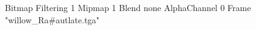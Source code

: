 {Bitmap
	{Filtering 1}
	{Mipmap 1}
	{Blend none}
	{AlphaChannel 0}
	{Frame "willow_Ra#autlate.tga"}
}
